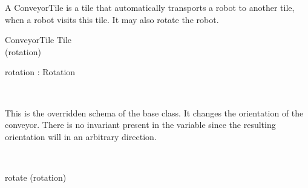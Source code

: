 \documentclass[12pt]{article}
\begin{document}
A ConveyorTile is a tile that automatically transports a robot to another tile, when a robot visits this tile. It may also rotate the robot.
\begin{class}{ConveyorTile}
Tile \\
\upharpoonright (rotation) \\
\begin{state}
rotation : Rotation
\end{state} \\
\begin{zpar}
This is the overridden schema of the base class. It changes the orientation of the conveyor. There is no invariant present in the variable since the resulting orientation will in an arbitrary direction.
\end{zpar} \\
\begin{schema}{rotate}
\Delta (rotation)
\end{schema}
\end{class}
\end{document}
